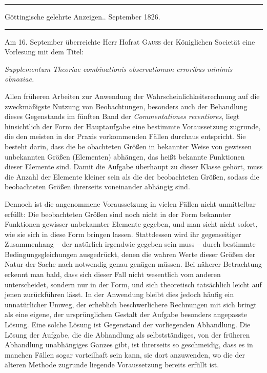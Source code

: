 \par\bigskip
\begin{center}
\rule{.88\textwidth}{.3pt}\par
Göttingische gelehrte Anzeigen.. September 1826.\par
\rule{.88\textwidth}{.3pt}
\end{center}

Am 16. September überreichte Herr Hofrat \textsc{Gauss} der Königlichen Societät eine Vorlesung mit dem Titel:
\begin{center}
\textit{Supplementum Theoriae combinationis observationum erroribus minimis obnoxiae.}
\end{center}
\noindent Allen früheren Arbeiten zur Anwendung der Wahrscheinlichkeitsrechnung auf die zweckmäßigste Nutzung von Beobachtungen, besonders auch der Behandlung dieses Gegenstands im fünften Band der \textit{Commentationes recentiores}, liegt hinsichtlich der Form der Hauptaufgabe eine bestimmte Voraussetzung zugrunde, die den meisten in der Praxis vorkommenden Fällen durchaus entspricht. Sie besteht darin, dass die be%
obachteten Größen in bekannter Weise von gewissen unbekannten Größen (Elementen) abhängen, das heißt bekannte Funktionen dieser Elemente sind. Damit die Aufgabe überhaupt zu dieser Klasse gehört, muss die Anzahl der Elemente kleiner sein als die der beobachteten Größen, sodass die beobachteten Größen ihrerseits voneinander abhängig sind.

Dennoch ist die angenommene Voraussetzung in vielen Fällen nicht unmittelbar erfüllt: Die beobachteten Größen sind noch nicht in der Form bekannter Funktionen gewisser unbekannter Elemente gegeben, und man sieht nicht sofort, wie sie sich in diese Form bringen lassen. Stattdessen wird ihr gegenseitiger Zusammenhang – der natürlich irgendwie gegeben sein muss – durch bestimmte Bedingungsgleichungen ausgedrückt, denen die wahren Werte dieser Größen der Natur der Sache nach notwendig genau genügen müssen. Bei näherer Betrachtung erkennt man bald, dass sich dieser Fall nicht wesentlich vom anderen unterscheidet, sondern nur in der Form, und sich theoretisch tatsächlich leicht auf jenen zurückführen lässt. In der Anwendung bleibt dies jedoch häufig ein unnatürlicher Umweg, der erheblich beschwerlichere Rechnungen mit sich bringt als eine eigene, der ursprünglichen Gestalt der Aufgabe besonders angepasste Lösung. Eine solche Lösung ist Gegenstand der vorliegenden Abhandlung. Die Lösung der Aufgabe, die die Abhandlung als selbstständiges, von der früheren Abhandlung unabhängiges Ganzes gibt, ist ihrerseits so geschmeidig, dass es in manchen Fällen sogar vorteilhaft sein kann, sie dort anzuwenden, wo die der älteren Methode zugrunde liegende Voraussetzung bereits erfüllt ist.

